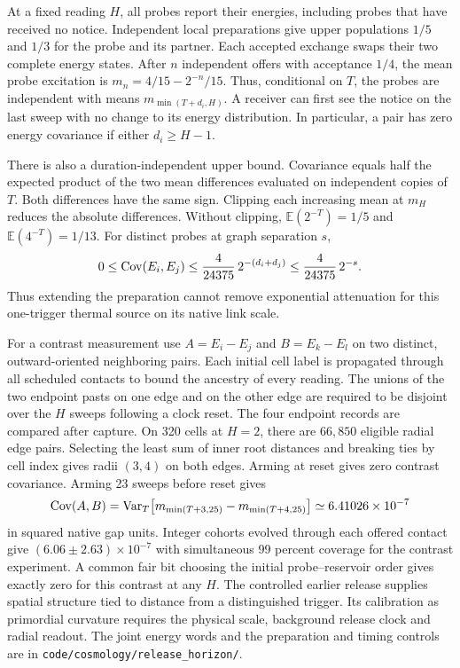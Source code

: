 \documentclass[11pt]{article}
\newcommand{\pathref}[1]{\nolinkurl{#1}}
\theoremstyle{remark}
\begin{document}
At a fixed reading \(H\), all probes report their energies, including probes
that have received no notice. Independent local preparations give upper
populations \(1/5\) and \(1/3\) for the probe and its partner. Each accepted
exchange swaps their two complete energy states. After \(n\) independent
offers with acceptance \(1/4\), the mean probe excitation is
\(m_n=4/15-2^{-n}/15\). Thus, conditional on \(T\), the probes are
independent with means \(m_{\min(T+d_i,H)}\).
A receiver can first see the notice on the last sweep with no change to
its energy distribution. In particular, a pair has zero energy covariance
if either \(d_i\geq H-1\).

There is also a duration-independent upper bound. Covariance equals half
the expected product of the two mean differences evaluated on independent
copies of \(T\). Both differences have the same sign. Clipping each
increasing mean at \(m_H\) reduces the absolute differences. Without
clipping, \({\mathbb E}(2^{-T})=1/5\) and
\({\mathbb E}(4^{-T})=1/13\). For distinct probes at graph separation \(s\),
\[
 0\leq {\rm Cov}(E_i,E_j)
 \leq \frac{4}{24375}\,2^{-(d_i+d_j)}
 \leq \frac{4}{24375}\,2^{-s}.
\]
Thus extending the preparation cannot remove exponential attenuation for
this one-trigger thermal source on its native link scale.

For a contrast measurement use \(A=E_i-E_j\) and \(B=E_k-E_l\) on
two distinct, outward-oriented neighboring pairs. Each initial cell label is
propagated through all scheduled contacts to bound the ancestry of every
reading. The unions of the two endpoint pasts on one edge and on the other
edge are required to be disjoint over the \(H\) sweeps following a clock
reset. The four endpoint records are compared after capture.
On 320 cells at \(H=2\), there are \(66{,}850\) eligible radial edge pairs.
Selecting the least sum of inner root distances and breaking ties by cell
index gives radii \((3,4)\) on both edges. Arming at reset gives zero
contrast covariance. Arming 23 sweeps before reset gives
\[
 {\rm Cov}(A,B)=
 {\rm Var}_T\!\left[m_{\min(T+3,25)}-m_{\min(T+4,25)}\right]
 \simeq 6.41026\times10^{-7}
\]
in squared native gap units. Integer cohorts evolved through each offered contact give
\((6.06\pm2.63)\times10^{-7}\) with simultaneous 99 percent coverage for
the contrast experiment. A common fair bit choosing the initial
probe--reservoir order gives exactly zero for this contrast at any \(H\).
The controlled earlier release supplies spatial structure tied to distance
from a distinguished trigger. Its calibration as primordial curvature
requires the physical scale, background release clock and radial readout.
The joint energy words and the preparation and timing controls are in
\pathref{code/cosmology/release_horizon/}.
\end{document}
